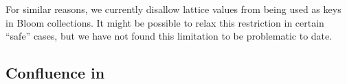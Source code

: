 For similar reasons, we currently disallow lattice values from being used as
keys in Bloom collections. It might be possible to relax this restriction in
certain ``safe'' cases, but we have not found this limitation to be problematic
to date.

\subsection{Confluence in \lang}
